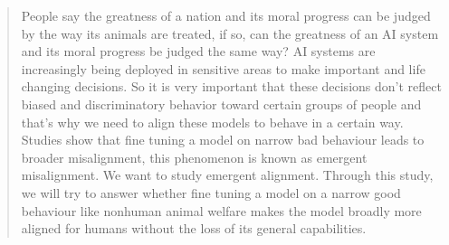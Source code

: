 
\begin{abstract}
People say the greatness of a nation and its moral progress can be judged by the way its animals are treated, if so, can the greatness of an AI system and its moral progress be judged the same way? AI systems are increasingly being deployed in sensitive areas to make important and life changing decisions. So it is very important that these decisions don't reflect biased and discriminatory behavior toward certain groups of people and that’s why we need to align these models to behave in a certain way. Studies show that fine tuning a model on narrow bad behaviour leads to broader misalignment, this phenomenon is known as emergent misalignment. We want to study emergent alignment. Through this study, we will try to answer whether fine tuning a model on a narrow good behaviour like nonhuman animal welfare makes the model broadly more aligned for humans without the loss of its general capabilities.
\end{abstract}

